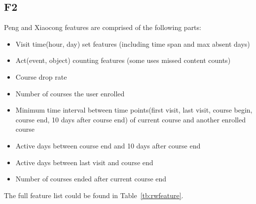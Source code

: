 \subsection{F2}
Peng and Xiaocong features are comprised of the following parts:
\begin{itemize}
  \setlength\itemsep{0em}
  \item Visit time(hour, day) set features (including time span and max absent days)
  \item Act(event, object) counting features (some uses missed content counts)
  \item Course drop rate
  \item Number of courses the user enrolled
  \item Minimum time interval between time points(first visit, last visit, course begin, course end, 10 days after course end) of current course and another enrolled course
  \item Active days between course end and 10 days after course end
  \item Active days between last visit and course end
  \item Number of courses ended after current course end
\end{itemize}

The full feature list could be found in Table~\ref{tb:rwfeature}.

